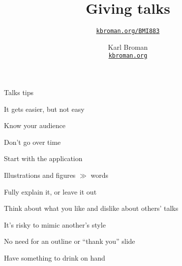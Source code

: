 \documentclass[aspectratio=169,12pt,t]{beamer}
\title{Giving talks}
\subtitle{}
\author{\href{https://kbroman.org/BMI883}{\tt kbroman.org/BMI883} }
\institute{}
\date{\small \hspace{3in} Karl Broman \\
  \hspace{3in} \href{https://kbroman.org}{\color{foreground}
    \small \tt kbroman.org}}
\begin{document}
{

\begin{frame}{Talks tips}

  \bi
\item It gets easier, but not easy
\item Know your audience
\item Don't go over time
\item Start with the application
\item Illustrations and figures $\gg$ words
\item Fully explain it, or leave it out
\item Think about what you like and dislike about others' talks
\item It's risky to mimic another's style
\item No need for an outline or ``thank you'' slide
\item Have something to drink on hand
  \ei

\end{frame}
}
\end{document}
